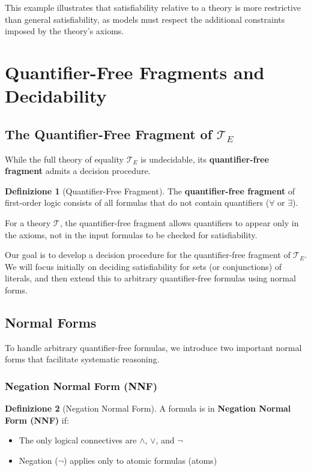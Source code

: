 \documentclass[11pt,a4paper]{article}
\theoremstyle{definition}
\newtheorem{definition}{Definizione}[section]
\theoremstyle{plain}
\theoremstyle{remark}
\begin{document}
This example illustrates that satisfiability relative to a theory is more restrictive than general satisfiability, as models must respect the additional constraints imposed by the theory's axioms.

\section{Quantifier-Free Fragments and Decidability}

\subsection{The Quantifier-Free Fragment of $\mathcal{T}_E$}

While the full theory of equality $\mathcal{T}_E$ is undecidable, its \textbf{quantifier-free fragment} admits a decision procedure.

\begin{definition}[Quantifier-Free Fragment]
The \textbf{quantifier-free fragment} of first-order logic consists of all formulas that do not contain quantifiers ($\forall$ or $\exists$).

For a theory $\mathcal{T}$, the quantifier-free fragment allows quantifiers to appear only in the axioms, not in the input formulas to be checked for satisfiability.
\end{definition}

Our goal is to develop a decision procedure for the quantifier-free fragment of $\mathcal{T}_E$. We will focus initially on deciding satisfiability for sets (or conjunctions) of literals, and then extend this to arbitrary quantifier-free formulas using normal forms.

\subsection{Normal Forms}

To handle arbitrary quantifier-free formulas, we introduce two important normal forms that facilitate systematic reasoning.

\subsubsection{Negation Normal Form (NNF)}

\begin{definition}[Negation Normal Form]
A formula is in \textbf{Negation Normal Form (NNF)} if:
\begin{itemize}
    \item The only logical connectives are $\wedge$, $\vee$, and $\neg$
    \item Negation ($\neg$) applies only to atomic formulas (atoms)
\end{itemize}
\end{definition}
\end{document}
